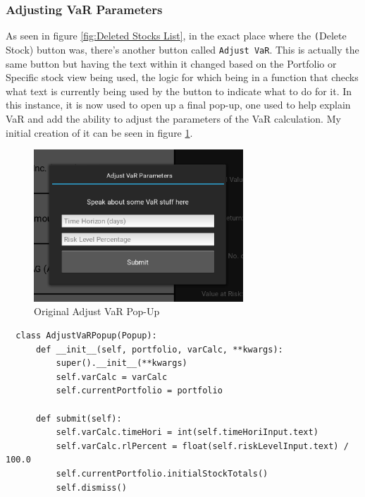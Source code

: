 \documentclass{article}
\begin{document}
\subsubsection{Adjusting VaR Parameters}
As seen in figure \ref{fig:Deleted Stocks List}, in the exact place where the \texttt(Delete Stock) button was, there's another button called \texttt{Adjust VaR}. This is actually the same button but having the text within it changed based on the Portfolio or Specific stock view being used, the logic for which being in a function that checks what text is currently being used by the button to indicate what to do for it. In this instance, it is now used to open up a final pop-up, one used to help explain VaR and add the ability to adjust the parameters of the VaR calculation. My initial creation of it can be seen in figure \ref{fig:OG Adjust VaR}.\\\vspace{0.3cm}

\begin{figure}[h]
  \centering
  \includegraphics[width=0.7\textwidth]{Images/Term 2 Images/image (11).png}
  \caption{Original Adjust VaR Pop-Up}
  \label{fig:OG Adjust VaR}
\end{figure}

\begin{verbatim}
  class AdjustVaRPopup(Popup): 
      def __init__(self, portfolio, varCalc, **kwargs):
          super().__init__(**kwargs)
          self.varCalc = varCalc
          self.currentPortfolio = portfolio

      def submit(self):       
          self.varCalc.timeHori = int(self.timeHoriInput.text)
          self.varCalc.rlPercent = float(self.riskLevelInput.text) / 100.0
          self.currentPortfolio.initialStockTotals()
          self.dismiss()
\end{verbatim}
\end{document}
